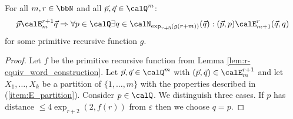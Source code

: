 \documentclass[a4paper,numberwithinsect,USenglish]{lipics-v2018}
\theoremstyle{plain}
\theoremstyle{remark}
\newcommand{\Qx}{\calQ}
\renewcommand{\epsilon}{\varepsilon}
\begin{document}
\begin{lemma}\label{lem:EF_relations}
	For all $m,r\in\bbN$ and all $\vec{p},\vec{q}\in \Qx^m$:  
	\[\vec{p} \calE^{r+1}_m \vec{q} \Rightarrow \forall p\in \Qx \exists q\in \calN_{\exp_{r+3}(g(r+m))}(\vec{q}): (\vec{p}, p) \calE^{r}_{m+1} (\vec{q}, q)\]
	for some primitive recursive function $g$.
\end{lemma}
\begin{proof}
	Let $f$ be the primitive recursive function from Lemma \ref{lem:r-equiv_word_construction}.
	Let $\vec{p}, \vec{q} \in \Qx^m$ with $(\vec{p}, \vec{q}) \in \calE^{r+1}_m$ and 
	let $X_1,\ldots,X_k$ be a partition of $\{1,\ldots,m\}$ with the properties described in (\ref{item:E_partition}). 
	Consider $p\in \Qx$. We distinguish three cases.
	If $p$ has distance $\leq 4\exp_{r+2}(2, f(r))$ from $\epsilon$ then we choose $q=p$.
	

\end{proof}
\end{document}
